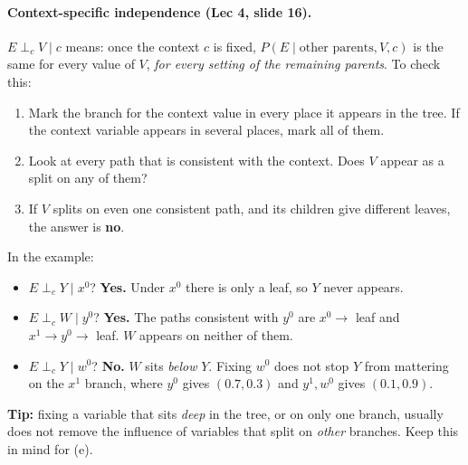 \documentclass[11pt]{article}
\newcommand{\indep}{\perp}
\begin{document}
\paragraph{Context-specific independence (Lec 4, slide 16).}
$E \indep_c V \mid c$ means: once the context $c$ is fixed,
$P(E \mid \text{other parents}, V, c)$ is the same for every value of $V$,
\emph{for every setting of the remaining parents}. To check this:
\begin{enumerate}
  \item Mark the branch for the context value in every place it appears in
        the tree. If the context variable appears in several places, mark
        all of them.
  \item Look at every path that is consistent with the context. Does $V$
        appear as a split on any of them?
  \item If $V$ splits on even one consistent path, and its children give
        different leaves, the answer is \textbf{no}.
\end{enumerate}
In the example:
\begin{itemize}
  \item $E \indep_c Y \mid x^0$? \textbf{Yes.} Under $x^0$ there is only a
        leaf, so $Y$ never appears.
  \item $E \indep_c W \mid y^0$? \textbf{Yes.} The paths consistent with
        $y^0$ are $x^0\to$ leaf and $x^1\to y^0\to$ leaf. $W$ appears on
        neither of them.
  \item $E \indep_c Y \mid w^0$? \textbf{No.} $W$ sits \emph{below} $Y$.
        Fixing $w^0$ does not stop $Y$ from mattering on the $x^1$ branch,
        where $y^0$ gives $(0.7,0.3)$ and $y^1, w^0$ gives $(0.1,0.9)$.
\end{itemize}
\textbf{Tip:} fixing a variable that sits \emph{deep} in the tree, or on
only one branch, usually does not remove the influence of variables that
split on \emph{other} branches. Keep this in mind for (e).
\end{document}
